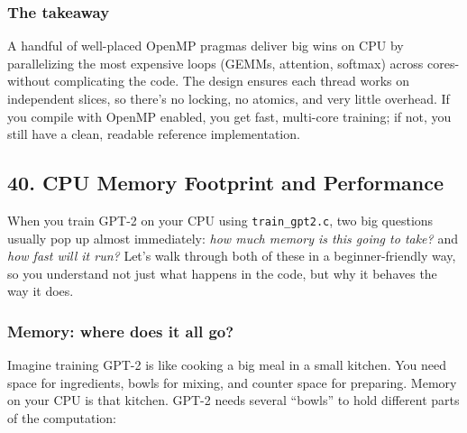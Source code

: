 \documentclass[
  letterpaper,
  DIV=11,
  numbers=noendperiod]{scrreprt}
\begin{document}
\subsubsection{The takeaway}\label{the-takeaway-28}

A handful of well-placed OpenMP pragmas deliver big wins on CPU by
parallelizing the most expensive loops (GEMMs, attention, softmax)
across cores-without complicating the code. The design ensures each
thread works on independent slices, so there's no locking, no atomics,
and very little overhead. If you compile with OpenMP enabled, you get
fast, multi-core training; if not, you still have a clean, readable
reference implementation.

\subsection{40. CPU Memory Footprint and
Performance}\label{cpu-memory-footprint-and-performance}

When you train GPT-2 on your CPU using \texttt{train\_gpt2.c}, two big
questions usually pop up almost immediately: \emph{how much memory is
this going to take?} and \emph{how fast will it run?} Let's walk through
both of these in a beginner-friendly way, so you understand not just
what happens in the code, but why it behaves the way it does.

\subsubsection{Memory: where does it all
go?}\label{memory-where-does-it-all-go}

Imagine training GPT-2 is like cooking a big meal in a small kitchen.
You need space for ingredients, bowls for mixing, and counter space for
preparing. Memory on your CPU is that kitchen. GPT-2 needs several
``bowls'' to hold different parts of the computation:
\end{document}

